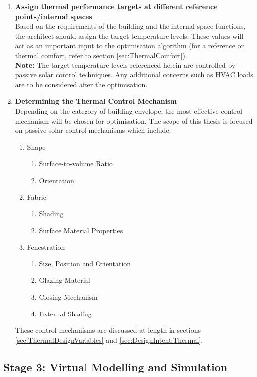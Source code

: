\begin{enumerate}
	\item \textbf{Assign thermal performance targets at different reference points/internal spaces}\\[3mm]
		Based on the requirements of the building and the internal space functions, the architect should assign the target temperature levels. These values will act as an important input to the optimisation algorithm (for a reference on thermal comfort, refer to section \ref{sec:ThermalComfort}).\\[3mm]
		\textbf{Note:} The target temperature levels referenced herein are controlled by passive solar control techniques. Any additional concerns such as HVAC loads are to be considered after the optimisation.
	\item \textbf{Determining the Thermal Control Mechanism}\\[3mm]
		Depending on the category of building envelope, the most effective control mechanism will be chosen for optimisation. The scope of this thesis is focused on passive solar control mechanisms which include:
		\begin{enumerate}
			\item Shape
				\begin{enumerate}
					\item Surface-to-volume Ratio
					\item Orientation
				\end{enumerate}
			\item Fabric
				\begin{enumerate}
					\item Shading
					\item Surface Material Properties
				\end{enumerate}
			\item Fenestration
				\begin{enumerate}
					\item Size, Position and Orientation
					\item Glazing Material
					\item Closing Mechanism
					\item External Shading
				\end{enumerate}
		\end{enumerate}
		These control mechanisms are discussed at length in sections \ref{sec:ThermalDesignVariables} and \ref{sec:DesignIntent:Thermal}.
\end{enumerate}


\clearpage
\subsection{Stage 3: Virtual Modelling and Simulation}
\label{sec:Stage3}
\vspace{0.5cm}

